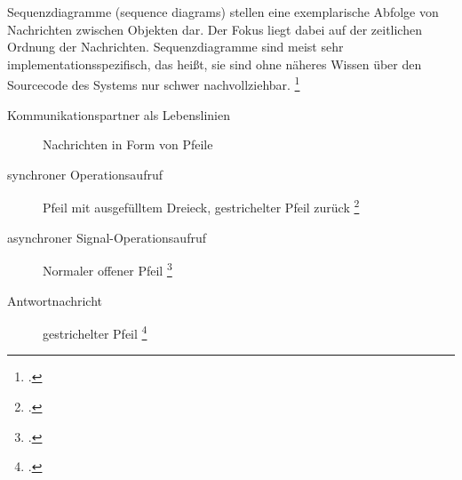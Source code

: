 \documentclass{lehramt-informatik-haupt}
\begin{document}
\begin{liQuellen}
\cite[Seite 401-471]{rupp}
\cite[Zusammengefügtes PDF Seite 115-117 / Kapitel „Assoziationen“ 33-35]{brinda}
\end{liQuellen}

Sequenzdiagramme (sequence diagrams) stellen eine exemplarische Abfolge
von Nachrichten zwischen Objekten dar. Der Fokus liegt dabei auf der
zeitlichen Ordnung der Nachrichten. Sequenzdiagramme sind meist sehr
implementationsspezifisch, das heißt, sie sind ohne näheres Wissen
über den Sourcecode des Systems nur schwer nachvollziehbar.
\footcite[Seite 167]{schatten}

\begin{description}
\item[Kommunikationspartner als Lebenslinien]

Nachrichten in Form von Pfeile

\item[synchroner Operationsaufruf]
Pfeil mit ausgefülltem Dreieck, gestrichelter Pfeil zurück
\footcite[Seite 507 (PDF 523): \emph{Synchronous Messages typically
represent operation calls and are shown with a filled arrow head.}]{uml}


\item[asynchroner Signal-Operationsaufruf]
Normaler offener Pfeil
%
\footcite[Seite 507 (PDF 523): \emph{Asynchronous Messages have an open
arrow head.}]{uml}


\item[Antwortnachricht]
gestrichelter Pfeil
%
\footcite[Seite 507 (PDF 523): \emph{The reply message from a method has a dashed
line.}]{uml}


\end{description}
\end{document}
